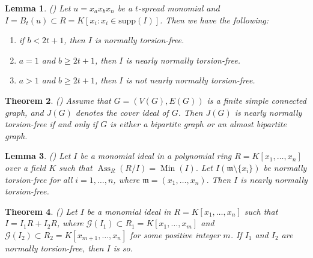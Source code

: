 \documentclass[11pt]{amsart}
\newtheorem{theorem}{Theorem}[section]
\newtheorem{lemma}[theorem]{Lemma}
\begin{document}
\begin{lemma}(\cite[Lemma 5.15]{NQKR}) \label{Lemma 5.15}
Let $u=x_ax_bx_n$ be a $t$-spread monomial and $I=B_t(u)\subset R=K[x_i:  x_i \in \mathrm{supp}(I)]$. Then we have the following:
\begin{enumerate}
\item[\em{(i)}] if $b < 2t+1$, then $I$ is normally torsion-free.
\item[\em{(ii)}] $a=1$ and $b\geq2t+1$, then $I$ is nearly normally torsion-free.
\item[\em{(iii)}] $a>1$ and $b\geq2t+1$, then $I$ is not nearly normally torsion-free.
\end{enumerate}
\end{lemma}


\begin{theorem}(\cite[Theorem 4.5]{NQKR}) \label{Theorem 4.5}
Assume that $G = (V(G), E(G))$ is a finite simple connected graph, and $J(G)$ denotes the cover ideal of $G$. 
Then $J(G)$ is nearly normally torsion-free if and only if $G$ is either a bipartite graph or an almost bipartite graph.
\end{theorem}


\begin{lemma}(\cite[Lemma 3.2]{NQKR}) \label{Lemma 3.2}
Let $I$ be a monomial ideal in a polynomial ring $R = K[x_1,\dots,x_n]$ over a field $K$ such that
 $\operatorname{Ass}_R(R/I)=\operatorname{Min}(I).$ Let $I(\mathfrak{m}\setminus \{x_i\})$ be normally torsion-free for all
$i=1,\dots,n$, where $\mathfrak{m}=(x_1,\dots,x_n).$ Then $I$ is nearly normally torsion-free.
\end{lemma}



\begin{theorem} (\cite[Theorem 2.5]{SN})  \label{NTF.Th.2.5}
Let $I$ be  a  monomial ideal  in  $R=K[x_1, \ldots, x_n]$ such that 
$I=I_1R + I_2R$, where
 $\mathcal{G}(I_1) \subset R_1=K[x_1, \ldots, x_m]$ and $\mathcal{G}(I_2) \subset R_2=K[x_{m+1}, \ldots, x_n]$
  for some  positive integer $m$. If $I_1$ and   $I_2$  are normally torsion-free, then  $I$  is so.
 \end{theorem}
\end{document}
